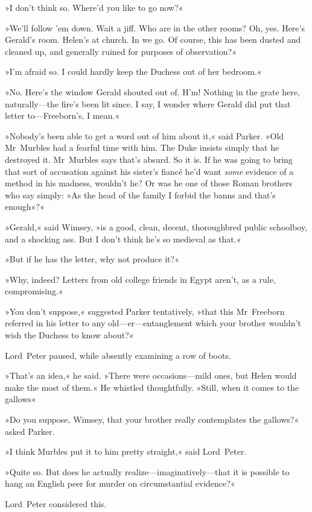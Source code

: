 »I don't think so. Where'd you like to go now?«

»We'll follow 'em down. Wait a jiff. Who are in the other rooms? Oh, yes. Here's Gerald's room. Helen's at church. In we go. Of course, this has been dusted and cleaned up, and generally ruined for purposes of observation?«

»I'm afraid so. I could hardly keep the Duchess out of her bedroom.«

»No. Here's the window Gerald shouted out of. H'm! Nothing in the grate here, naturally—the fire's been lit since. I say, I wonder where Gerald did put that letter to—Freeborn's, I mean.«

»Nobody's been able to get a word out of him about it,« said Parker. »Old Mr~Murbles had a fearful time with him. The Duke insists simply that he destroyed it. Mr~Murbles says that's absurd. So it is. If he was going to bring that sort of accusation against his sister's fiancé he'd want \textit{some} evidence of a method in his madness, wouldn't he? Or was he one of those Roman brothers who say simply: »As the head of the family I forbid the banns and that's enough«?«

»Gerald,« said Wimsey, »is a good, clean, decent, thoroughbred public schoolboy, and a shocking ass. But I don't think he's so medieval as that.«

»But if he has the letter, why not produce it?«

»Why, indeed? Letters from old college friends in Egypt aren't, as a rule, compromising.«

»You don't suppose,« suggested Parker tentatively, »that this Mr~Freeborn referred in his letter to any old—er—entanglement which your brother wouldn't wish the Duchess to know about?«

Lord~Peter paused, while absently examining a row of boots.

»That's an idea,« he said. »There were occasions—mild ones, but Helen would make the most of them.« He whistled thoughtfully. »Still, when it comes to the gallows\longdash«

»Do you suppose, Wimsey, that your brother really contemplates the gallows?« asked Parker.

»I think Murbles put it to him pretty straight,« said Lord~Peter.

»Quite so. But does he actually realize—imaginatively—that it is possible to hang an English peer for murder on circumstantial evidence?«

Lord~Peter considered this.

